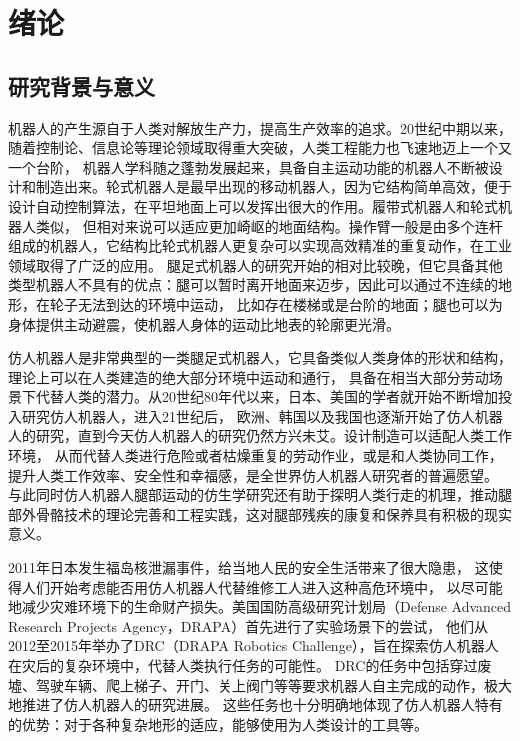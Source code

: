 \newcommand{\aref}[1]{\autoref{#1}\space}
\newcommand{\eref}[1]{式\eqref{#1}}
\renewcommand{\algorithmcfname}{算法}
\chapter{绪论}
\section{研究背景与意义}
机器人的产生源自于人类对解放生产力，提高生产效率的追求。20世纪中期以来，随着控制论、信息论等理论领域取得重大突破，人类工程能力也飞速地迈上一个又一个台阶，
机器人学科随之蓬勃发展起来，具备自主运动功能的机器人不断被设计和制造出来。轮式机器人是最早出现的移动机器人，因为它结构简单高效，便于设计自动控制算法，在平坦地面上可以发挥出很大的作用。履带式机器人和轮式机器人类似，
但相对来说可以适应更加崎岖的地面结构。操作臂一般是由多个连杆组成的机器人，它结构比轮式机器人更复杂可以实现高效精准的重复动作，在工业领域取得了广泛的应用。
腿足式机器人的研究开始的相对比较晚，但它具备其他类型机器人不具有的优点：腿可以暂时离开地面来迈步，因此可以通过不连续的地形\cite{Schraft2000ServiceR}，在轮子无法到达的环境中运动，
比如存在楼梯或是台阶的地面；腿也可以为身体提供主动避震\cite{waldron1986adaptive}，使机器人身体的运动比地表的轮廓更光滑。

仿人机器人是非常典型的一类腿足式机器人，它具备类似人类身体的形状和结构，理论上可以在人类建造的绝大部分环境中运动和通行，
具备在相当大部分劳动场景下代替人类的潜力。从20世纪80年代以来，日本、美国的学者就开始不断增加投入研究仿人机器人，进入21世纪后，
欧洲、韩国以及我国也逐渐开始了仿人机器人的研究，直到今天仿人机器人的研究仍然方兴未艾。设计制造可以适配人类工作环境，
从而代替人类进行危险或者枯燥重复的劳动作业，或是和人类协同工作，提升人类工作效率、安全性和幸福感，是全世界仿人机器人研究者的普遍愿望。
与此同时仿人机器人腿部运动的仿生学研究还有助于探明人类行走的机理，推动腿部外骨骼技术的理论完善和工程实践，这对腿部残疾的康复和保养具有积极的现实意义。

2011年日本发生福岛核泄漏事件，给当地人民的安全生活带来了很大隐患，
这使得人们开始考虑能否用仿人机器人代替维修工人进入这种高危环境中，
以尽可能地减少灾难环境下的生命财产损失。美国国防高级研究计划局（Defense Advanced Research Projects Agency，DRAPA）首先进行了实验场景下的尝试，
他们从2012至2015年举办了DRC（DRAPA Robotics Challenge），旨在探索仿人机器人在灾后的复杂环境中，代替人类执行任务的可能性。
DRC的任务中包括穿过废墟、驾驶车辆、爬上梯子、开门、关上阀门等等要求机器人自主完成的动作，极大地推进了仿人机器人的研究进展。
这些任务也十分明确地体现了仿人机器人特有的优势：对于各种复杂地形的适应，能够使用为人类设计的工具等。

